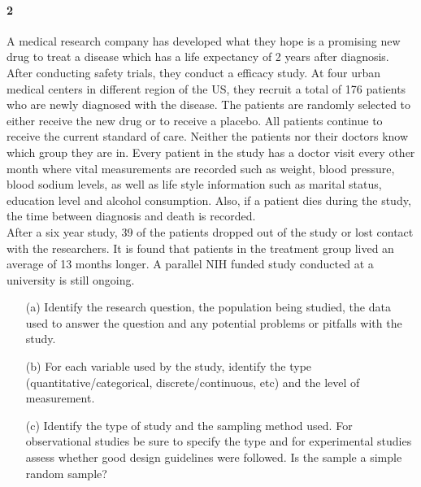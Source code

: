 \documentclass{article}
\begin{document}
\begin{flushleft}
\paragraph{2} A medical research company has developed what they hope is a promising new drug to treat a disease which has a life expectancy of 2 years after diagnosis. After conducting safety trials, they conduct a efficacy study. At four urban medical centers in different region of the US, they recruit a total of 176 patients who are newly diagnosed with the disease. The patients are randomly selected to either receive the new drug or to receive a placebo. All patients continue to receive the current standard of care. Neither the patients nor their doctors know which group they are in. Every patient in the study has a doctor visit every other month where vital measurements are recorded such as weight, blood pressure, blood sodium levels, as well as life style information such as marital status, education level and alcohol consumption. Also, if a patient dies during the study, the time between diagnosis and death is recorded.\\
\medskip
After a six year study, 39 of the patients dropped out of the study or lost contact with the researchers. It is found that patients in the treatment group lived an average of 13 months longer. A parallel NIH funded study conducted at a university is still ongoing.

\begin{itemize}
\item [(a)] Identify the research question, the population being studied, the data used to answer the question and any potential problems or pitfalls with the study.
\vspace{1.5in}
\item[(b)] For each variable used by the study, identify the type (quantitative/categorical, discrete/continuous, etc) and the level of measurement.
\vspace{1.5in}
\item[(c)] Identify the type of study and the sampling method used. For observational studies be sure to specify the type and for experimental studies assess whether good design guidelines were followed. Is the sample a simple random sample? 
\end{itemize}


\newpage

\end{flushleft}
\end{document}
